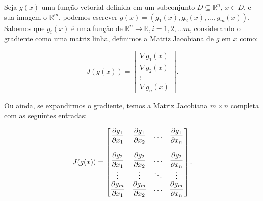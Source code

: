 \begin{definition}
    Seja \( g(x) \) uma função vetorial definida em um subconjunto
    \( D \subseteq \mathbb{R}^n \), \( x \in D \),
    e sua imagem o \( \mathbb{R}^m \), podemos escrever
    \( g(x) = (g_1(x), g_2(x), ..., g_m(x)) \). Sabemos que \( g_i(x) \) é
    uma função de \( \mathbb{R}^n \rightarrow \mathbb{R}, i = 1, 2, ... m \),
    considerando o gradiente como uma matriz linha, definimos a Matriz
    Jacobiana de \(g\) em \(x\) como:

    \begin{equation}
        J(g(x)) = \begin{bmatrix}
                    \nabla g_1(x) \\
                    \nabla g_2(x) \\
                    \vdots \\
                    \nabla g_n(x)
                  \end{bmatrix}.
    \end{equation}

    Ou ainda, se expandirmos o gradiente, temos a Matriz Jacobiana \( m \times n \)
    completa com as seguintes entradas:

    \begin{equation}
        J(g(x)) = \begin{bmatrix}
                    \displaystyle{\frac{\partial g_1}{\partial x_1}} & \displaystyle{\frac{\partial g_1}{\partial x_2}} & \hdots & \displaystyle{\frac{\partial g_1}{\partial x_n}}\\
                    \\
                    \displaystyle{\frac{\partial g_2}{\partial x_1}} & \displaystyle{\frac{\partial g_2}{\partial x_2}} & \hdots & \displaystyle{\frac{\partial g_2}{\partial x_n}}\\
                    \vdots & \vdots & \ddots & \vdots \\
                    \displaystyle{\frac{\partial g_m}{\partial x_1}} & \displaystyle{\frac{\partial g_m}{\partial x_2}} & \hdots & \displaystyle{\frac{\partial g_m}{\partial x_n}}\\
                  \end{bmatrix}.
    \end{equation}


\end{definition}



%
